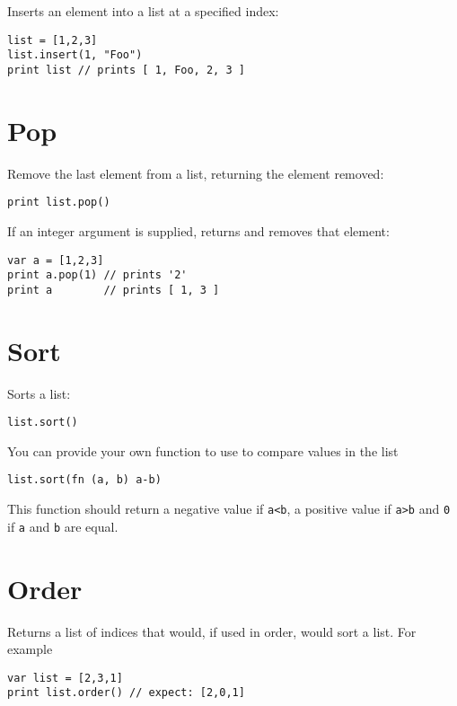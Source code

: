 Inserts an element into a list at a specified index:

\begin{lstlisting}
list = [1,2,3]
list.insert(1, "Foo")
print list // prints [ 1, Foo, 2, 3 ]
\end{lstlisting}

\hypertarget{pop}{%
\section{Pop}\label{pop}}

Remove the last element from a list, returning the element removed:

\begin{lstlisting}
print list.pop()
\end{lstlisting}

If an integer argument is supplied, returns and removes that element:

\begin{lstlisting}
var a = [1,2,3]
print a.pop(1) // prints '2'
print a        // prints [ 1, 3 ]
\end{lstlisting}

\hypertarget{sort}{%
\section{Sort}\label{sort}}

Sorts a list:

\begin{lstlisting}
list.sort()
\end{lstlisting}

You can provide your own function to use to compare values in the list

\begin{lstlisting}
list.sort(fn (a, b) a-b)
\end{lstlisting}

This function should return a negative value if \texttt{a\textless{}b},
a positive value if \texttt{a\textgreater{}b} and \texttt{0} if
\texttt{a} and \texttt{b} are equal.

\hypertarget{order}{%
\section{Order}\label{order}}

Returns a list of indices that would, if used in order, would sort a
list. For example

\begin{lstlisting}
var list = [2,3,1]
print list.order() // expect: [2,0,1]
\end{lstlisting}

